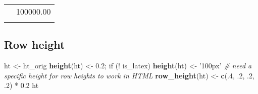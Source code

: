 \documentclass[]{article}
\newenvironment{Shaded}{\begin{snugshade}}{\end{snugshade}}
\newcommand{\KeywordTok}[1]{\textcolor[rgb]{0.13,0.29,0.53}{\textbf{{#1}}}}
\newcommand{\DecValTok}[1]{\textcolor[rgb]{0.00,0.00,0.81}{{#1}}}
\newcommand{\FloatTok}[1]{\textcolor[rgb]{0.00,0.00,0.81}{{#1}}}
\newcommand{\StringTok}[1]{\textcolor[rgb]{0.31,0.60,0.02}{{#1}}}
\newcommand{\CommentTok}[1]{\textcolor[rgb]{0.56,0.35,0.01}{\textit{{#1}}}}
\newcommand{\NormalTok}[1]{{#1}}
\begin{document}
\begin{table}[h]
\begin{centering}
\begin{tabularx}{0.5\textwidth}{p{} p{}}
\hhline{>{\arrayrulecolor{black}}|>{\arrayrulecolor{black}}->{\arrayrulecolor{black}}|>{\arrayrulecolor{black}}-}
\arrayrulecolor{black}
\multicolumn{1}{|p{0.4\textwidth}|}{\raggedright\rule{0pt}{\baselineskip+4pt}\hspace*{4pt}Thyme\hspace*{4pt}\rule[-4pt]{0pt}{4pt}} & \multicolumn{1}{p{0.1\textwidth}|}{\raggedright\rule{0pt}{\baselineskip+4pt}\hspace*{4pt}100000.00\hspace*{4pt}\rule[-4pt]{0pt}{4pt}} \tabularnewline[-0.5pt]
\hhline{>{\arrayrulecolor{black}}|>{\arrayrulecolor{black}}->{\arrayrulecolor{black}}|>{\arrayrulecolor{black}}-}
\arrayrulecolor{black}
\end{tabularx}
\par\end{centering}
\end{table}

\FloatBarrier

\subsection{Row height}\label{row-height}

\begin{Shaded}
\begin{Highlighting}[]
\NormalTok{ht <-}\StringTok{ }\NormalTok{ht_orig}
\KeywordTok{height}\NormalTok{(ht) <-}\StringTok{ }\FloatTok{0.2}\NormalTok{; }
\NormalTok{if (!}\StringTok{ }\NormalTok{is_latex) }\KeywordTok{height}\NormalTok{(ht) <-}\StringTok{ '100px'} \CommentTok{# need a specific height for row heights to work in HTML}
\KeywordTok{row_height}\NormalTok{(ht) <-}\StringTok{ }\KeywordTok{c}\NormalTok{(.}\DecValTok{4}\NormalTok{, .}\DecValTok{2}\NormalTok{, .}\DecValTok{2}\NormalTok{, .}\DecValTok{2}\NormalTok{) *}\StringTok{ }\FloatTok{0.2}
\NormalTok{ht}
\end{Highlighting}
\end{Shaded}
\end{document}
